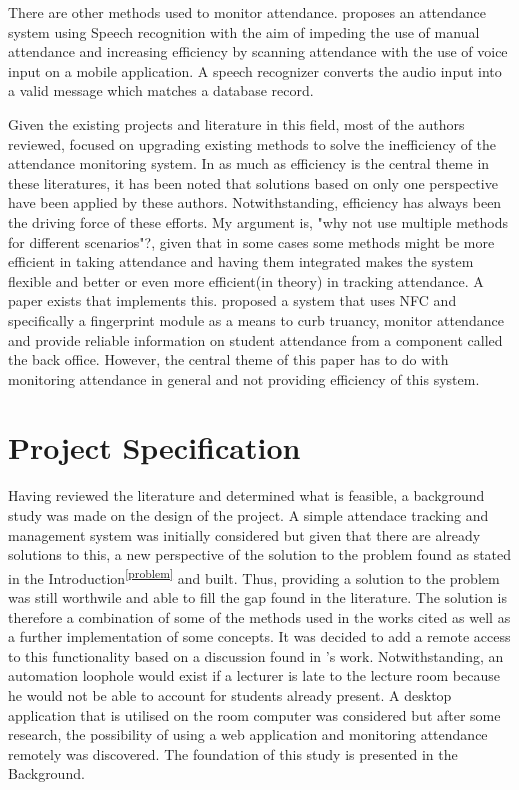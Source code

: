 There are other methods used to monitor attendance. \citeauthor{9716261} proposes an attendance system using Speech recognition with the aim of impeding the use of manual attendance and increasing efficiency by scanning attendance with the use of voice input on a mobile application. A speech recognizer converts the audio input into a valid message which matches a database record.\cite{9716261}
 
Given the existing projects and literature in this field, most of the authors reviewed, focused on upgrading existing methods to solve the inefficiency of the attendance monitoring system.\cite{KaziARP, Tt2021, Www2012, Bhagat2020, soe2018implementation, Rachna} In as much as efficiency is the central theme in these literatures, it has been noted that solutions based on only one perspective have been applied by these authors. Notwithstanding, efficiency has always been the driving force of these efforts. My argument is, "why not use multiple methods for different scenarios"?, given that in some cases some methods might be more efficient in taking attendance and having them integrated makes the system flexible and better or even more efficient(in theory) in tracking attendance. A paper exists that implements this. \citeauthor{6266137} proposed a system that uses NFC and specifically a fingerprint module as a means to curb truancy, monitor attendance and provide reliable information on student attendance from a component called the back office. However, the central theme of this paper has to do with monitoring attendance in general and not providing efficiency of this system.\cite{6266137}
 
 
\section*{Project Specification}
\label{specification}
Having reviewed the literature and determined what is feasible, a background study was made on the design of the project. A simple attendace tracking and management system was initially considered but given that there are already solutions to this, a new perspective of the solution to the problem found as stated in the Introduction\textsuperscript{\ref{problem}} and built. Thus, providing a solution to the problem was still worthwile and able to fill the gap found in the literature. The solution is therefore a combination of some of the methods used in the works cited as well as a further implementation of some concepts. It was decided to add a remote access to this functionality based on a discussion found in \citeauthor{Rachna}'s work. Notwithstanding, an automation loophole would exist if a lecturer is late to the lecture room because he would not be able to account for students already present. A desktop application that is utilised on the room computer was considered but after some research, the possibility of using a web application and monitoring attendance remotely was discovered. The foundation of this study is presented in the Background.
